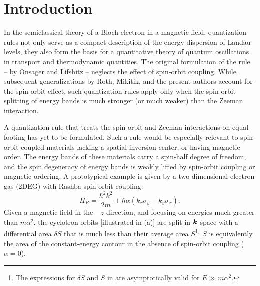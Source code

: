 \documentclass[aps, showpacs, twocolumn, notitlepage, superscriptaddress]{revtex4-1}
\begin{document}
\maketitle

\section{Introduction}
In the semiclassical theory of a Bloch electron in a magnetic field,  quantization rules not  only serve as a compact description of the  energy dispersion of Landau levels, they also form the basis for a quantitative theory of quantum oscillations in transport\cite{SdH} and thermodynamic\cite{dHvA} quantities.  The original formulation of the rule -- by Onsager\cite{Onsager} and Lifshitz\cite{lifshitz_kosevich,lifshitz_kosevich_jetp} -- neglects the effect of spin-orbit coupling. While subsequent generalizations by Roth\cite{rotheffham,rothmag}, Mikitik\cite{Mikitik_quantizationrule}, and the present authors\cite{topoferm,100p} account for the spin-orbit effect, such quantization rules apply only when the spin-orbit splitting of energy bands is much stronger (or much weaker) than the Zeeman interaction.

A quantization rule that treats the spin-orbit and Zeeman interactions on equal footing has yet to be formulated. Such a rule would be especially relevant to spin-orbit-coupled materials lacking a spatial inversion center, or having magnetic order. The energy bands of these materials carry a spin-half degree of freedom, and the spin degeneracy of energy bands is weakly lifted by spin-orbit coupling or magnetic ordering. A prototypical example is given by  a two-dimensional electron gas (2DEG) with Rashba spin-orbit coupling:
\begin{equation}
H_R=\frac{{\hbar^2} k^2}{2m}+\hbar\alpha  (k_{x}\sigma_{y}-k_{y}\sigma_{x}).\label{eq:Rashba-Hamiltonian}
\end{equation}
Given a magnetic field in the $-z$ direction, and focusing on energies much greater than $m\alpha^2$, the cyclotron orbits [illustrated in (a)]   are split in $\boldsymbol{k}$-space with a differential area  $\delta S$ that is much less than their average area $S$\footnote{The expressions for $\delta S$ and $S$ in  are asymptotically valid for $E{\gg}m\alpha^2$.}:
$S$ is equivalently the area of the constant-energy contour in the absence of spin-orbit coupling ($\alpha{=}0$).
\end{document}
